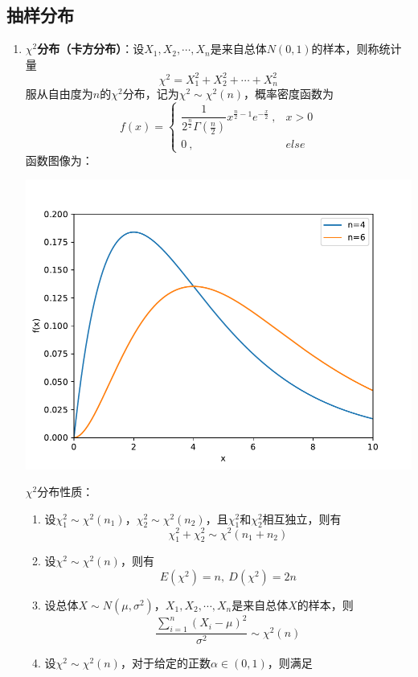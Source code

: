 \documentclass[12pt,a4paper,UTF8]{book}
\begin{document}
\subsection{抽样分布}
\begin{enumerate}
\item \textbf{$\chi^2$分布（卡方分布）}：设$X_1,X_2,\cdots,X_n$是来自总体$N\left(0,1\right)$的样本，则称统计量
\[\chi^2=X_1^2+X_2^2+\cdots+X_n^2\]
服从自由度为$n$的$\chi^2$分布，记为$\chi^2\sim\chi^2\left(n\right)$，概率密度函数为
\[f\left(x\right)=\left\{\begin{matrix}\dfrac{1}{2^{\frac{n}{2}}\Gamma\left(\frac{n}{2}\right)}x^{\frac{n}{2}-1}e^{-\frac{x}{2}}\ ,&x>0\\0\ ,&else\end{matrix}\right.\]
函数图像为：
\begin{center}\includegraphics[scale=0.5]{./figure/chi.pdf}\end{center}
$\chi^2$分布性质：
\begin{enumerate}
\item 设$\chi_1^2\sim\chi^2\left(n_1\right)$，$\chi_2^2\sim\chi^2\left(n_2\right)$，且$\chi_1^2$和$\chi_2^2$相互独立，则有
\[\chi_1^2+\chi_2^2\sim\chi^2\left(n_1+n_2\right)\]
\item 设$\chi^2\sim\chi^2\left(n\right)$，则有
\[E\left(\chi^2\right)=n,\ D\left(\chi^2\right)=2n\]
\item 设总体$X\sim N\left(\mu,\sigma^2\right)$，$X_1,X_2,\cdots,X_n$是来自总体$X$的样本，则
\[\frac{\sum\limits_{i=1}^{n}\left(X_i-\mu\right)^2}{\sigma^2}\sim\chi^2\left(n\right)\]
\item 设$\chi^2\sim\chi^2\left(n\right)$，对于给定的正数$\alpha\in\left(0,1\right)$，则满足

\end{enumerate}
\end{enumerate}
\end{document}
